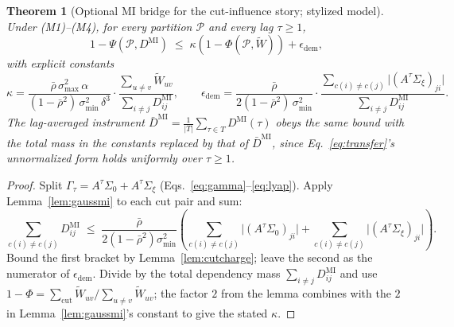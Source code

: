 \documentclass[11pt]{article}
\newtheorem{theorem}{Theorem}[section]
\theoremstyle{definition}
\theoremstyle{remark}
\newcommand{\Wt}{\widetilde{W}}
\begin{document}
\begin{theorem}[Optional MI bridge for the cut-influence story; stylized model]
    \label{thm:transfer}
    Under (M1)--(M4), for every partition $\mathcal{P}$ and every lag
    $\tau \geq 1$,
    \begin{equation}
        1 - \Psi(\mathcal{P}, D^{\mathrm{MI}})
        \;\leq\;
        \kappa \left(1 - \Phi(\mathcal{P}, \Wt)\right)
        + \epsilon_{\mathrm{dem}},
        \label{eq:transfer}
    \end{equation}
    with explicit constants
    \begin{equation*}
        \kappa
        = \frac{\bar{\rho}\, \sigma_{\max}^2\, \alpha}
        {(1 - \bar{\rho}^2)\, \sigma_{\min}^2\, \delta^{3}}
        \cdot
        \frac{\sum_{u \neq v} \Wt_{uv}}{\sum_{i \neq j} D^{\mathrm{MI}}_{ij}},
        \qquad
        \epsilon_{\mathrm{dem}}
        = \frac{\bar{\rho}}{2(1 - \bar{\rho}^2)\, \sigma_{\min}^2}
        \cdot
        \frac{\sum_{c(i) \neq c(j)}
            \big|(A^\tau \Sigma_\xi)_{ji}\big|}{\sum_{i \neq j}
            D^{\mathrm{MI}}_{ij}}.
    \end{equation*}
    The lag-averaged instrument
    $\bar{D}^{\mathrm{MI}} = \tfrac{1}{|T|}\sum_{\tau \in T} D^{\mathrm{MI}}(\tau)$
    obeys the same bound with the total mass in the constants replaced by that
    of $\bar{D}^{\mathrm{MI}}$, since Eq.~\eqref{eq:transfer}'s unnormalized
    form holds uniformly over $\tau \geq 1$.
\end{theorem}

\begin{proof}
    Split $\Gamma_\tau = A^\tau \Sigma_0 + A^\tau \Sigma_\xi$
    (Eqs.~\eqref{eq:gamma}--\eqref{eq:lyap}).
    Apply Lemma~\ref{lem:gaussmi} to each cut pair and sum:
    \[
        \sum_{c(i) \neq c(j)} D^{\mathrm{MI}}_{ij}
        \;\leq\;
        \frac{\bar{\rho}}{2(1 - \bar{\rho}^2)\sigma_{\min}^2}
        \left(
        \sum_{c(i) \neq c(j)} \big|(A^\tau \Sigma_0)_{ji}\big|
        + \sum_{c(i) \neq c(j)} \big|(A^\tau \Sigma_\xi)_{ji}\big|
        \right).
    \]
    Bound the first bracket by Lemma~\ref{lem:cutcharge}; leave the second as
    the numerator of $\epsilon_{\mathrm{dem}}$.
    Divide by the total dependency mass $\sum_{i \neq j} D^{\mathrm{MI}}_{ij}$
    and use
    $1 - \Phi = \sum_{\mathrm{cut}} \Wt_{uv} / \sum_{u \neq v} \Wt_{uv}$;
    the factor $2$ from the lemma combines with the $2$ in
    Lemma~\ref{lem:gaussmi}'s constant to give the stated $\kappa$.
\end{proof}
\end{document}
